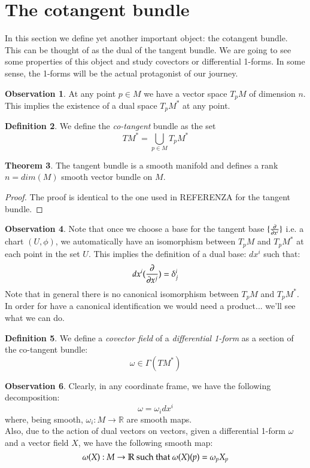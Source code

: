\documentclass[12pt,a4paper]{report}
\theoremstyle{definition}
\newtheorem{Def}{Definition}[chapter]
\theoremstyle{Theorem}
\newtheorem{Theo}[Def]{Theorem}
\theoremstyle{break}
\theoremstyle{definition}
\newtheorem{Obs}[Def]{Observation}
\begin{document}
		\section{The cotangent bundle}
		In this section we define yet another important object: the cotangent bundle. This can be thought of as the dual of the tangent bundle. We are going to see some properties of this object and study covectors or differential 1-forms. In some sense, the 1-forms will be the actual protagonist of our journey.
		\begin{Obs}
			At any point $p\in M$ we have a vector space $T_pM$ of dimension $n$. This implies the existence of a dual space $T_pM^* $ at any point.
		\end{Obs}
		\begin{Def}
			We define the \textit{co-tangent} bundle as the set 
			$$TM^*=\bigcup_{p\in M}T_pM^*$$
		\end{Def}
		\begin{Theo}
			The tangent bundle is a smooth manifold and defines a rank $n=dim (M)$ smooth vector bundle on $M$.
		\end{Theo}
		\begin{proof}
			The proof is identical to the one used in REFERENZA for the tangent bundle.
		\end{proof}
		\begin{Obs}
			Note that once we choose a base for the tangent base $\{{\partial \over \partial x^i}\}$ i.e. a chart $(U,\phi)$, we automatically have an isomorphism between $T_pM$ and $T_pM^*$ at each point in the set $U$. This implies the definition of a dual base: $dx^i$ such that:
			$$dx^i({\partial\over \partial x^j})=\delta^i_j$$
			Note that in general there is no canonical isomorphism between $T_pM$ and $T_pM^*$. In order for have a canonical identification we would need a product... we'll see what we can do.
		\end{Obs}
		\begin{Def}
			We define a \textit{covector field} of a \textit{differential 1-form} as a section of the co-tangent bundle:
			$$\omega\in \Gamma(TM^*)$$
		\end{Def}
		\begin{Obs}
			Clearly, in any coordinate frame, we have the following decomposition:
			$$\omega=\omega_i dx^i$$
			where, being smooth, $\omega_i:M\rightarrow \mathbb{R}$ are smooth maps.\\
			Also, due to the action of dual vectors on vectors, given a differential 1-form  $\omega$ and a vector field $X$, we have the following smooth map:
			$$\omega(X):M\rightarrow \mathbb{R}\hbox{ such that }\omega(X)(p)=\omega_pX_p$$
		\end{Obs}
\end{document}

